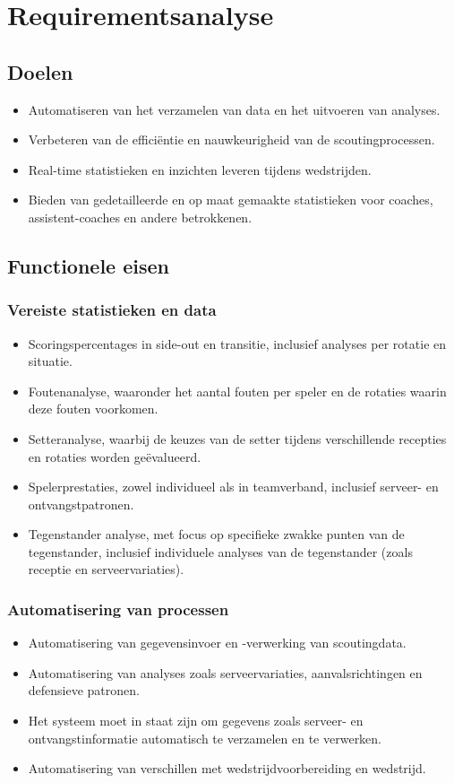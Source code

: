 \section{Requirementsanalyse}
\label{ch:requirementsanalyse}

\subsection{Doelen}
\begin{itemize}
  \item Automatiseren van het verzamelen van data en het uitvoeren van analyses.
  \item Verbeteren van de efficiëntie en nauwkeurigheid van de scoutingprocessen.
  \item Real-time statistieken en inzichten leveren tijdens wedstrijden.
  \item Bieden van gedetailleerde en op maat gemaakte statistieken voor coaches, assistent-coaches en andere betrokkenen.
\end{itemize}

\subsection{Functionele eisen}
\subsubsection{Vereiste statistieken en data}
\begin{itemize}
  \item Scoringspercentages in side-out en transitie, inclusief analyses per rotatie en situatie.
  \item Foutenanalyse, waaronder het aantal fouten per speler en de rotaties waarin deze fouten voorkomen.
  \item Setteranalyse, waarbij de keuzes van de setter tijdens verschillende recepties en rotaties worden geëvalueerd.
  \item Spelerprestaties, zowel individueel als in teamverband, inclusief serveer- en ontvangstpatronen.
  \item Tegenstander analyse, met focus op specifieke zwakke punten van de tegenstander, inclusief individuele analyses van de tegenstander (zoals receptie en serveervariaties).
\end{itemize}

\subsubsection{Automatisering van processen}
\begin{itemize}
  \item Automatisering van gegevensinvoer en -verwerking van scoutingdata.
  \item Automatisering van analyses zoals serveervariaties, aanvalsrichtingen en defensieve patronen.
  \item Het systeem moet in staat zijn om gegevens zoals serveer- en ontvangstinformatie automatisch te verzamelen en te verwerken.
  \item Automatisering van verschillen met wedstrijdvoorbereiding en wedstrijd.
\end{itemize}

